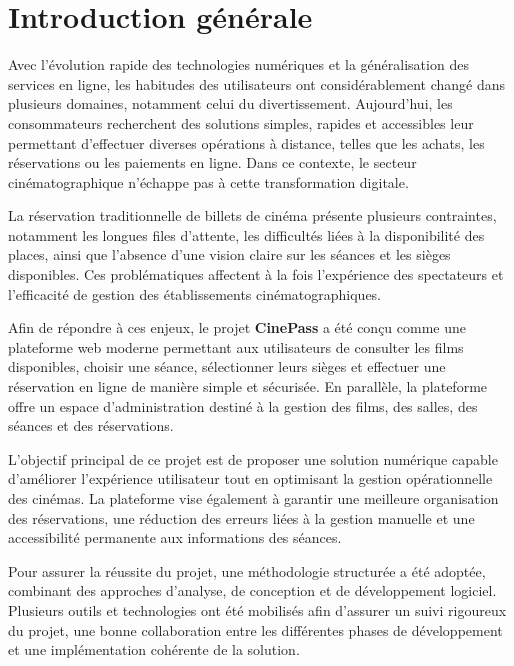 \documentclass[12pt]{report}
\begin{document}
\newpage

\listoftables
\newpage


\chapter*{Introduction générale}

Avec l’évolution rapide des technologies numériques et la généralisation des services en ligne, les habitudes des utilisateurs ont considérablement changé dans plusieurs domaines, notamment celui du divertissement. Aujourd’hui, les consommateurs recherchent des solutions simples, rapides et accessibles leur permettant d’effectuer diverses opérations à distance, telles que les achats, les réservations ou les paiements en ligne. Dans ce contexte, le secteur cinématographique n’échappe pas à cette transformation digitale.

La réservation traditionnelle de billets de cinéma présente plusieurs contraintes, notamment les longues files d’attente, les difficultés liées à la disponibilité des places, ainsi que l’absence d’une vision claire sur les séances et les sièges disponibles. Ces problématiques affectent à la fois l’expérience des spectateurs et l’efficacité de gestion des établissements cinématographiques.

Afin de répondre à ces enjeux, le projet \textbf{CinePass} a été conçu comme une plateforme web moderne permettant aux utilisateurs de consulter les films disponibles, choisir une séance, sélectionner leurs sièges et effectuer une réservation en ligne de manière simple et sécurisée. En parallèle, la plateforme offre un espace d’administration destiné à la gestion des films, des salles, des séances et des réservations.

L’objectif principal de ce projet est de proposer une solution numérique capable d’améliorer l’expérience utilisateur tout en optimisant la gestion opérationnelle des cinémas. La plateforme vise également à garantir une meilleure organisation des réservations, une réduction des erreurs liées à la gestion manuelle et une accessibilité permanente aux informations des séances.

Pour assurer la réussite du projet, une méthodologie structurée a été adoptée, combinant des approches d’analyse, de conception et de développement logiciel. Plusieurs outils et technologies ont été mobilisés afin d’assurer un suivi rigoureux du projet, une bonne collaboration entre les différentes phases de développement et une implémentation cohérente de la solution.
\end{document}
